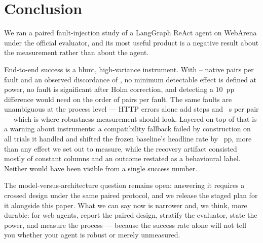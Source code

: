 \section{Conclusion}
\label{sec:conclusion}

We ran a paired fault-injection study of a LangGraph ReAct agent on WebArena under
the official evaluator, and its most useful product is a negative result about the
measurement rather than about the agent.

End-to-end success is a blunt, high-variance instrument. With
\ResWebDomMissingNNat--\ResWebTimeoutNNat{} native pairs per fault and an observed
discordance of \PiDNative{}, no minimum detectable effect is defined at \Power{}
power, no fault is significant after Holm correction, and detecting a $10$~pp
difference would need on the order of \PairsForTenPPObserved{} pairs per fault. The
same faults are unambiguous at the process level --- HTTP errors alone add
\BehWebHttpErrorStepDelta{} steps and \BehWebHttpErrorTimeDelta{}~s per pair ---
which is where robustness measurement should look. Layered on top of that is a
warning about instruments: a compatibility fallback failed by construction on all
\OfficialFallbackN{} trials it handled and shifted the frozen baseline's headline
rate by \BaselineSwing{}~pp, more than any effect we set out to measure, while the
recovery artifact consisted mostly of constant columns and an outcome restated as a
behavioural label. Neither would have been visible from a single success number.

The model-versus-architecture question remains open: answering it requires a
crossed design under the same paired protocol, and we release the staged plan for it
alongside this paper. What we can say now is narrower and, we think, more durable:
for web agents, report the paired design, stratify the evaluator, state the power,
and measure the process --- because the success rate alone will not tell you whether
your agent is robust or merely unmeasured.

